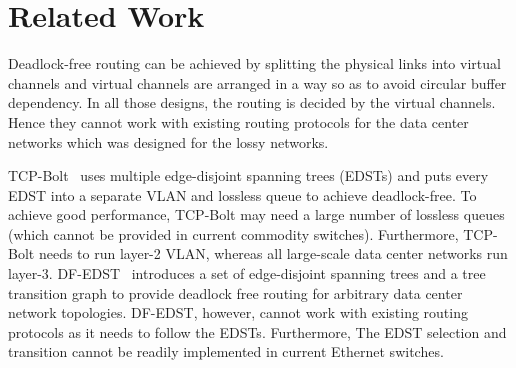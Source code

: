 \section{Related Work}\label{sec:related}




Deadlock-free routing \cite{dally,duato93,dally93,sancho2004,flich2012survey,lash,wu2003fault,glass,duato2001,domke2011} can be achieved by splitting the physical links into virtual channels and virtual channels are arranged in a way so as to avoid circular buffer dependency. In all those designs, the routing is decided by the virtual channels. Hence they cannot work with existing routing protocols for the data center networks which was designed for the lossy networks.

TCP-Bolt~\cite{tcpbolt} uses multiple edge-disjoint spanning trees (EDSTs) and puts every EDST into a separate VLAN and lossless queue to achieve deadlock-free. To achieve good performance, TCP-Bolt may need a large number of lossless queues (which cannot be provided in current commodity switches). Furthermore, TCP-Bolt needs to run layer-2 VLAN, whereas all large-scale data center networks run layer-3. 
DF-EDST~\cite{dfedst16} introduces a set of edge-disjoint spanning trees and a tree transition graph to provide deadlock free routing for arbitrary data center network topologies. DF-EDST, however, cannot work with existing routing protocols as it needs to follow the EDSTs. Furthermore, The EDST selection and transition cannot be readily implemented in current Ethernet switches.

